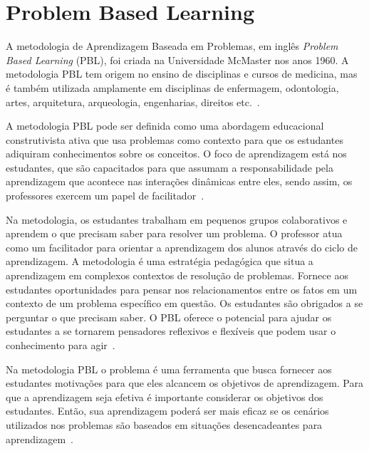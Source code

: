 \label{cap-revisao}
\acresetall
\section{Problem Based Learning}

A metodologia de Aprendizagem Baseada em Problemas, em
inglês \textit{Problem Based Learning} (PBL),
foi criada na Universidade McMaster nos anos 1960.
A metodologia PBL tem origem no ensino de disciplinas e cursos de medicina,
mas é também utilizada amplamente em disciplinas de enfermagem,
odontologia, artes, arquitetura, arqueologia, engenharias, direitos
etc.~\cite{albanese2010problem, amos1998problem}.

A metodologia PBL pode ser definida como uma abordagem educacional
construtivista ativa que usa problemas como contexto para que os estudantes
adiquiram conhecimentos sobre os conceitos. O foco de aprendizagem está
nos estudantes, que são capacitados para que assumam a responsabilidade pela
aprendizagem que acontece nas interações dinâmicas
entre eles, sendo assim, os professores exercem um papel
de facilitador~\cite{dolmans2005problem, albanese2010problem,
amos1998problem, forsythe2002problem}.

Na metodologia, os estudantes trabalham em pequenos grupos colaborativos
e aprendem o que precisam saber para resolver um problema.
O professor atua como um facilitador para orientar a aprendizagem
dos alunos através do ciclo
de aprendizagem.
A metodologia é uma estratégia pedagógica que situa a aprendizagem em
complexos contextos de resolução de problemas.
Fornece aos estudantes oportunidades para pensar nos relacionamentos
entre os fatos em um contexto de um problema específico em questão.
Os estudantes são obrigados a se perguntar o que precisam saber.
O PBL oferece o potencial para ajudar os estudantes a se tornarem
pensadores reflexivos e flexíveis que podem usar o conhecimento
para agir~\cite{hmelo2004problem}.

Na metodologia PBL o problema é uma ferramenta que busca fornecer
aos estudantes motivações para que eles alcancem os
objetivos de aprendizagem.
Para que a aprendizagem seja efetiva é importante considerar os objetivos
dos estudantes.
Então, sua aprendizagem poderá ser mais eficaz se os cenários utilizados
nos problemas são baseados em situações desencadeantes para
aprendizagem~\cite{wood2003problem, o2012practical, amos1998problem}.


